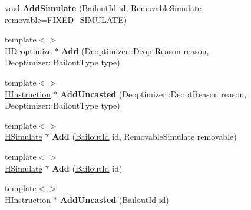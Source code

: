 \begin{DoxyCompactItemize}
\item 
void {\bfseries Add\+Simulate} (\hyperlink{classv8_1_1internal_1_1_bailout_id}{Bailout\+Id} id, Removable\+Simulate removable=F\+I\+X\+E\+D\+\_\+\+S\+I\+M\+U\+L\+A\+TE)\hypertarget{classv8_1_1internal_1_1_h_graph_builder_a3c9c8f998d8d79f6329e2d39756522bd}{}\label{classv8_1_1internal_1_1_h_graph_builder_a3c9c8f998d8d79f6329e2d39756522bd}

\item 
{\footnotesize template$<$$>$ }\\\hyperlink{classv8_1_1internal_1_1_h_deoptimize}{H\+Deoptimize} $\ast$ {\bfseries Add} (Deoptimizer\+::\+Deopt\+Reason reason, Deoptimizer\+::\+Bailout\+Type type)\hypertarget{classv8_1_1internal_1_1_h_graph_builder_a50c6e73a6b5bac5ca473a1235352ba17}{}\label{classv8_1_1internal_1_1_h_graph_builder_a50c6e73a6b5bac5ca473a1235352ba17}

\item 
{\footnotesize template$<$$>$ }\\\hyperlink{classv8_1_1internal_1_1_h_instruction}{H\+Instruction} $\ast$ {\bfseries Add\+Uncasted} (Deoptimizer\+::\+Deopt\+Reason reason, Deoptimizer\+::\+Bailout\+Type type)\hypertarget{classv8_1_1internal_1_1_h_graph_builder_a4885fdecb01f06c42ccbadfa1663a88d}{}\label{classv8_1_1internal_1_1_h_graph_builder_a4885fdecb01f06c42ccbadfa1663a88d}

\item 
{\footnotesize template$<$$>$ }\\\hyperlink{classv8_1_1internal_1_1_h_simulate}{H\+Simulate} $\ast$ {\bfseries Add} (\hyperlink{classv8_1_1internal_1_1_bailout_id}{Bailout\+Id} id, Removable\+Simulate removable)\hypertarget{classv8_1_1internal_1_1_h_graph_builder_a2f9a5a6886f61b1c58224a248af1bc75}{}\label{classv8_1_1internal_1_1_h_graph_builder_a2f9a5a6886f61b1c58224a248af1bc75}

\item 
{\footnotesize template$<$$>$ }\\\hyperlink{classv8_1_1internal_1_1_h_simulate}{H\+Simulate} $\ast$ {\bfseries Add} (\hyperlink{classv8_1_1internal_1_1_bailout_id}{Bailout\+Id} id)\hypertarget{classv8_1_1internal_1_1_h_graph_builder_a5a6dca5268760c271b73c16a3fbd568b}{}\label{classv8_1_1internal_1_1_h_graph_builder_a5a6dca5268760c271b73c16a3fbd568b}

\item 
{\footnotesize template$<$$>$ }\\\hyperlink{classv8_1_1internal_1_1_h_instruction}{H\+Instruction} $\ast$ {\bfseries Add\+Uncasted} (\hyperlink{classv8_1_1internal_1_1_bailout_id}{Bailout\+Id} id)\hypertarget{classv8_1_1internal_1_1_h_graph_builder_a1c0eef80951bfeab68d62778423e13ab}{}\label{classv8_1_1internal_1_1_h_graph_builder_a1c0eef80951bfeab68d62778423e13ab}


\end{DoxyCompactItemize}
